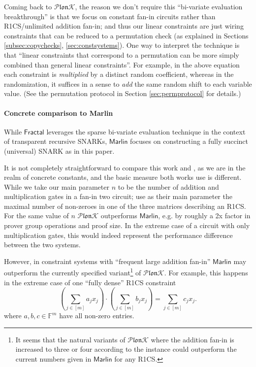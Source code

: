 \documentclass[11pt]{article} %
\newcommand{\plonk}{\ensuremath{\mathcal{P} \mathfrak{lon}\mathcal{K}}\xspace}
\newcommand{\F}{\ensuremath{\mathbb F}\xspace}
\newcommand{\sumj}[1]{\sum_{j\in[#1]}}
\newcommand{\marlin}{\ensuremath{\mathsf{Marlin}}\xspace}
\newcommand{\fractal}{\ensuremath{\mathsf{Fractal}}\xspace}
\begin{document}
Coming back to \plonk, the reason we don't require this ``bi-variate evaluation breakthrough'' is that we focus on constant fan-in circuits rather than R1CS/unlimited addition fan-in; and thus our linear constraints are just wiring constraints that can be reduced to a permutation check (as explained in Sections \ref{subsec:copychecks}, \ref{sec:constsystems}). One way to interpret the \cite{permorig} technique is that ``linear constraints that correspond to a permutation can be more simply combined than general linear constraints''. For example, in the above equation each constraint is \emph{multiplied} by a distinct random coefficient, whereas in the \cite{permorig} randomization, it suffices in a sense to \emph{add} the same random shift to each variable value. (See the permutation protocol in Section \ref{sec:permprotocol} for details.)
\paragraph{Concrete comparison to Marlin}
While \fractal leverages the sparse bi-variate evaluation technique in the context of transparent recursive SNARKs, \marlin focuses on constructing a fully succinct (universal) SNARK as in this paper.

It is not completely straightforward to compare this work and \cite{marlin}, as we are in 
the realm of concrete constants, and the basic measure both works use is different.
While we take our main parameter $n$ to be the number of addition and multiplication gates in a fan-in two circuit;
\cite{marlin} use as their main parameter the maximal number of non-zeroes in one of the three matrices describing an R1CS. For the same value of $n$ \plonk outperforms \marlin, e.g. by roughly a 2x factor in prover group operations and proof size.
In the extreme case of a circuit with only multiplication gates, this would indeed represent the performance difference between the two systems.

However, in constraint systems with ``frequent large addition fan-in'' \marlin may outperform the currently specified variant\footnote{It seems that the natural variants of \plonk where the addition fan-in is increased to three or four according to the instance could outperform the current numbers given in \marlin for any R1CS.} of \plonk.
For example, this happens in the extreme case of one ``fully dense'' R1CS constraint
\[\left(\sum_{j\in [m]} a_jx_j \right)\cdot \left( \sumj{m} b_jx_j\right) = \sumj{m}c_jx_j.\]
where $a,b,c\in \F^m$ have all non-zero entries.
\end{document}
